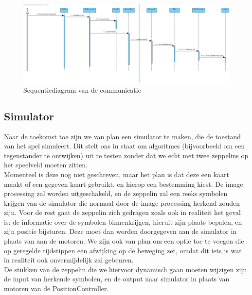 \documentclass[tt]{penoverslag}
\begin{document}
\begin{figure}[H]
\begin{center}
\includegraphics[width=1\textwidth]{PiToClientCommunication.png}
\end{center}
\caption{Sequentiediagram van de communicatie}
\label{Sequence}
\end{figure}

\subsection{Simulator}
Naar de toekomst toe zijn we van plan een simulator te maken, die de toestand van het spel simuleert. Dit stelt ons in staat om algoritmes (bijvoorbeeld om een tegenstander te ontwijken) uit te testen zonder dat we echt met twee zeppelins op het speelveld moeten zitten.\\
Momenteel is deze nog niet geschreven, maar het plan is dat deze een kaart maakt of een gegeven kaart gebruikt, en hierop een bestemming kiest. De image processing zal worden uitgeschakeld, en de zeppelin zal een reeks symbolen krijgen van de simulator die normaal door de image processing herkend zouden zijn. Voor de rest gaat de zeppelin zich gedragen zoals ook in realiteit het geval is: de informatie over de symbolen binnenkrijgen, hieruit zijn plaats bepalen, en zijn positie bijsturen. Deze moet dan worden doorgegeven aan de simulator in plaats van aan de motoren. We zijn ook van plan om een optie toe te voegen die op geregelde tijdstippen een afwijking op de beweging zet, omdat dit iets is wat in realiteit ook onvermijdelijk zal gebeuren.\\
De stukken van de zeppelin die we hiervoor dynamisch gaan moeten wijzigen zijn de input van herkende symbolen, en de output naar simulator in plaats van motoren van de PositionController.


\end{document}
